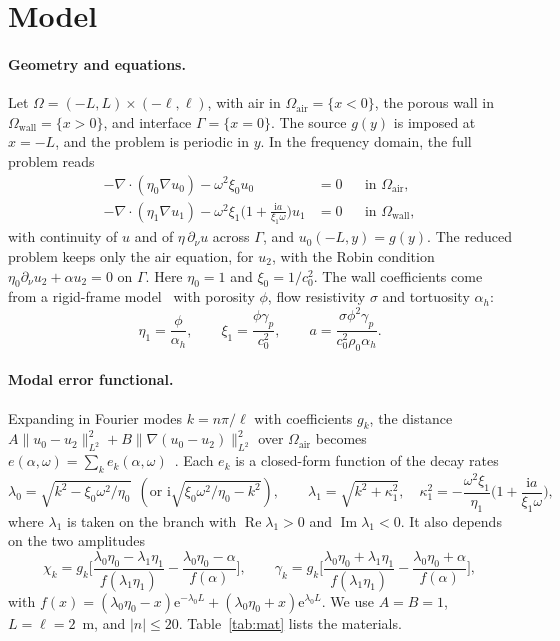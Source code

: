 \documentclass[10pt,a4paper]{article}
\newcommand{\ee}{\mathrm{e}}
\newcommand{\ii}{\mathrm{i}}
\begin{document}
\section{Model}
\paragraph{Geometry and equations.}
Let $\Omega=(-L,L)\times(-\ell,\ell)$, with air in $\Omega_\mathrm{air}=\{x<0\}$, the porous wall in $\Omega_\mathrm{wall}=\{x>0\}$, and interface $\Gamma=\{x=0\}$. The source $g(y)$ is imposed at $x=-L$, and the problem is periodic in $y$. In the frequency domain, the full problem reads
\begin{align}
-\nabla\!\cdot(\eta_0\nabla u_0)-\omega^2\xi_0u_0&=0 &&\text{in }\Omega_\mathrm{air},\\
-\nabla\!\cdot(\eta_1\nabla u_1)-\omega^2\xi_1\Big(1+\frac{\ii a}{\xi_1\omega}\Big)u_1&=0 &&\text{in }\Omega_\mathrm{wall},\label{eq:wall}
\end{align}
with continuity of $u$ and of $\eta\,\partial_\nu u$ across $\Gamma$, and $u_0(-L,y)=g(y)$. The reduced problem keeps only the air equation, for $u_2$, with the Robin condition $\eta_0\partial_\nu u_2+\alpha u_2=0$ on $\Gamma$. Here $\eta_0=1$ and $\xi_0=1/c_0^2$. The wall coefficients come from a rigid-frame model~\cite{allard2009} with porosity $\phi$, flow resistivity $\sigma$ and tortuosity $\alpha_h$:
\[
\eta_1=\frac{\phi}{\alpha_h},\qquad \xi_1=\frac{\phi\gamma_p}{c_0^2},\qquad a=\frac{\sigma\phi^2\gamma_p}{c_0^2\rho_0\alpha_h}.
\]

\paragraph{Modal error functional.}
Expanding in Fourier modes $k=n\pi/\ell$ with coefficients $g_k$, the distance $A\|u_0-u_2\|^2_{L^2}+B\|\nabla(u_0-u_2)\|^2_{L^2}$ over $\Omega_\mathrm{air}$ becomes $e(\alpha,\omega)=\sum_k e_k(\alpha,\omega)$~\cite{magoules2021}. Each $e_k$ is a closed-form function of the decay rates
\[
\lambda_0=\sqrt{k^2-\xi_0\omega^2/\eta_0}\ \ (\text{or } \ii\sqrt{\xi_0\omega^2/\eta_0-k^2}),\qquad
\lambda_1=\sqrt{k^2+\kappa_1^2},\quad \kappa_1^2=-\frac{\omega^2\xi_1}{\eta_1}\Big(1+\frac{\ii a}{\xi_1\omega}\Big),
\]
where $\lambda_1$ is taken on the branch with $\operatorname{Re}\lambda_1>0$ and $\operatorname{Im}\lambda_1<0$. It also depends on the two amplitudes
\[
\chi_k=g_k\Big[\frac{\lambda_0\eta_0-\lambda_1\eta_1}{f(\lambda_1\eta_1)}-\frac{\lambda_0\eta_0-\alpha}{f(\alpha)}\Big],\qquad
\gamma_k=g_k\Big[\frac{\lambda_0\eta_0+\lambda_1\eta_1}{f(\lambda_1\eta_1)}-\frac{\lambda_0\eta_0+\alpha}{f(\alpha)}\Big],
\]
with $f(x)=(\lambda_0\eta_0-x)\ee^{-\lambda_0L}+(\lambda_0\eta_0+x)\ee^{\lambda_0L}$. We use $A=B=1$, $L=\ell=2$~m, and $|n|\le20$. Table~\ref{tab:mat} lists the materials.
\end{document}
